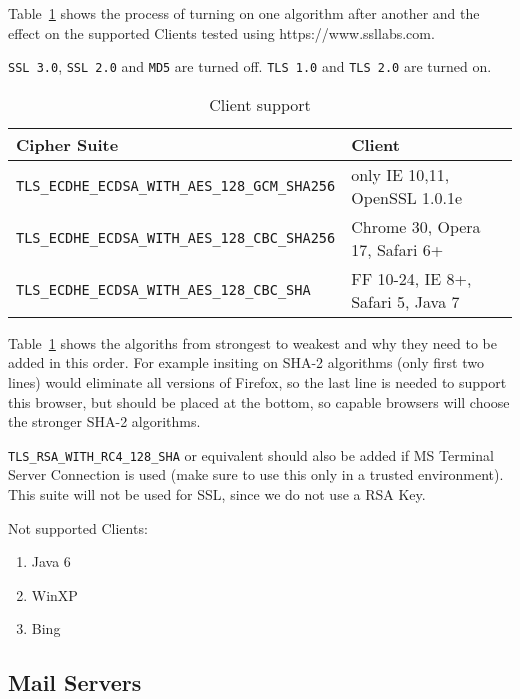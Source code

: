 Table~\ref{tab:MS_IIS_Client_Support} shows the process of turning on
one algorithm after another and the effect on the supported Clients
tested using https://www.ssllabs.com.

\verb|SSL 3.0|, \verb|SSL 2.0| and \verb|MD5| are turned off.
\verb|TLS 1.0| and \verb|TLS 2.0| are turned on.

\begin{table}[h]
  \centering
  \small
  \begin{tabular}{ll}
    \toprule
    Cipher Suite & Client \\
    \midrule
    \verb|TLS_ECDHE_ECDSA_WITH_AES_128_GCM_SHA256| & only IE 10,11, OpenSSL 1.0.1e \\
    \verb|TLS_ECDHE_ECDSA_WITH_AES_128_CBC_SHA256| & Chrome 30, Opera 17, Safari 6+ \\
    \verb|TLS_ECDHE_ECDSA_WITH_AES_128_CBC_SHA| & FF 10-24, IE 8+, Safari 5, Java 7\\
    \bottomrule 
 \end{tabular}
  \caption{Client support}
  \label{tab:MS_IIS_Client_Support}
\end{table}

Table~\ref{tab:MS_IIS_Client_Support} shows the algoriths from
strongest to weakest and why they need to be added in this order. For
example insiting on SHA-2 algorithms (only first two lines) would
eliminate all versions of Firefox, so the last line is needed to
support this browser, but should be placed at the bottom, so capable
browsers will choose the stronger SHA-2 algorithms.

\verb|TLS_RSA_WITH_RC4_128_SHA| or equivalent should also be added if
MS Terminal Server Connection is used (make sure to use this only in a
trusted environment). This suite will not be used for SSL, since we do
not use a RSA Key.




Not supported Clients:
\begin{enumerate}
\item Java 6
\item WinXP
\item Bing
\end{enumerate}


\subsection{Mail Servers}

